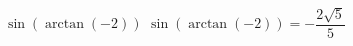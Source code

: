  {$\sin\left(\arctan\left(-2\right)\right)$ }
{ $\sin\left(\arctan\left(-2\right)\right) = -\dfrac{2\sqrt{5}}{5}$}
